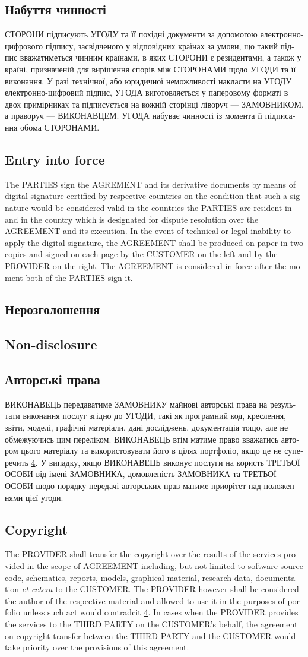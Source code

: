 \documentclass[a4paper]{article}
\newcommand\freetextcommon[3]{\begin{ukrainian}#1\end{ukrainian}\switchcolumn\begin{english}#2\end{english}\switchcolumn\begin{estonian}#3\end{estonian}}
\newcommand\freetext[3]{\freetextcommon{#1}{#2}{#3}\switchcolumn*}
\newcommand\clause[6]{\freetext{\section{#1}#4}{\section{#2}#5}{\section{#3}#6}}
\newcommand\smartref[2]{\hyperref[#1]{#2\ref{#1}}}
\begin{document}
\begin{Form}
\begin{paracol}{3}
        {}
      \clause
        {Набуття чинності}
        {Entry into force}
        {}
        {СТОРОНИ підписують УГОДУ та її похідні документи за допомогою електронно-цифрового підпису, засвідченого у відповідних країнах за умови, що такий підпис вважатиметься чинним країнами, в яких СТОРОНИ є резидентами, а також у країні, призначеній для вирішення спорів між СТОРОНАМИ щодо УГОДИ та її виконання. У разі технічної, або юридичної неможливості накласти на УГОДУ електронно-цифровий підпис, УГОДА виготовляється у паперовому форматі в двох примірниках та підписується на кожній сторінці ліворуч — ЗАМОВНИКОМ, а праворуч — ВИКОНАВЦЕМ. УГОДА набуває чинності із момента її підписання обома СТОРОНАМИ.}
        {The PARTIES sign the AGREMENT and its derivative documents by means of digital signature certified by respective countries on the condition that such a signature would be considered valid in the countries the PARTIES are resident in and in the country which is designated for dispute resolution over the AGREEMENT and its execution. In the event of technical or legal inability to apply the digital signature, the AGREEMENT shall be produced on paper in two copies and signed on each page by the CUSTOMER on the left and by the PROVIDER on the right. The AGREEMENT is considered in force after the moment both of the PARTIES sign it.}
        {}
      \clause
        {Нерозголошення}
        {Non-disclosure}
        {}
        {\label{sec:nda}}
        {}
        {}
      \clause
        {Авторські права}
        {Copyright}
        {}
        {ВИКОНАВЕЦЬ передаватиме ЗАМОВНИКУ майнові авторські права на результати виконання послуг згідно до УГОДИ, такі як програмний код, креслення, звіти, моделі, графічні матеріали, дані досліджень, документація тощо, але не обмежуючись цим переліком. ВИКОНАВЕЦЬ втім матиме право вважатись автором цього матеріалу та використовувати його в цілях портфоліо, якщо це не суперечить \smartref{sec:nda}{}. У випадку, якщо ВИКОНАВЕЦЬ виконує послуги на користь ТРЕТЬОЇ ОСОБИ від імені ЗАМОВНИКА, домовленість ЗАМОВНИКА та ТРЕТЬОЇ ОСОБИ щодо порядку передачі авторських прав матиме приорітет над положеннями цієї угоди.}
        {The PROVIDER shall transfer the copyright over the results of the services provided in the scope of AGREEMENT including, but not limited to software source code, schematics, reports, models, graphical material, research data, documentation \emph{et cetera} to the CUSTOMER. The PROVIDER however shall be considered the author of the respective material and allowed to use it in the purposes of porfolio unless such act would contradcit \smartref{sec:nda}{}. In cases when the PROVIDER provides the services to the THIRD PARTY on the CUSTOMER's behalf, the agreement on copyright transfer between the THIRD PARTY and the CUSTOMER would take priority over the provisions of this agreement.}
        {}
    \end{paracol}
  \appendix
  
  
  
  \end{Form}
\end{document}
